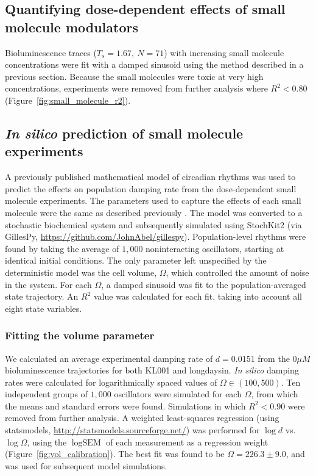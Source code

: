 \documentclass[11pt, letterpaper]{article}
\begin{document}
\subsection*{Quantifying dose-dependent effects of small molecule modulators}
Bioluminescence traces ($T_s = 1.67,\ N=71$) with increasing small molecule concentrations were fit with a damped sinusoid using the method described in a previous section.
Because the small molecules were toxic at very high concentrations, experiments were removed from further analysis where $R^2 < 0.80$ (Figure~\ref{fig:small_molecule_r2}).

\subsection*{{\itshape In silico} prediction of small molecule experiments}
A previously published mathematical model of circadian rhythms \cite{Hirota2012} was used to predict the effects on population damping rate from the dose-dependent small molecule experiments.
The parameters used to capture the effects of each small molecule were the same as described previously \cite{St.John2014}.
The model was converted to a stochastic biochemical system and subsequently simulated using StochKit2 \cite{Sanft2011a} (via GillesPy, \url{https://github.com/JohnAbel/gillespy}).
Population-level rhythms were found by taking the average of $1,000$ noninteracting oscillators, starting at identical initial conditions.
The only parameter left unspecified by the deterministic model was the cell volume, $\Omega$, which controlled the amount of noise in the system.
For each $\Omega$, a damped sinusoid was fit to the population-averaged state trajectory. 
An $R^2$ value was calculated for each fit, taking into account all eight state variables.

\subsubsection*{Fitting the volume parameter}
We calculated an average experimental damping rate of $d = 0.0151$ from the $0 \mu M$ bioluminescence trajectories for both KL001 and longdaysin.
{\itshape In silico} damping rates were calculated for logarithmically spaced values of $\Omega \in (100, 500)$.
Ten independent groups of $1,000$ oscillators were simulated for each $\Omega$, from which the means and standard errors were found.
Simulations in which $R^2 < 0.90$ were removed from further analysis.
A weighted least-squares regression (using statsmodels, \url{http://statsmodels.sourceforge.net/}) was performed for $\log d$ vs.\ $\log \Omega$, using the $\log \text{SEM}$ of each measurement as a regression weight (Figure~\ref{fig:vol_calibration}).
The best fit was found to be $\Omega = 226.3 \pm 9.0$, and was used for subsequent model simulations.
\end{document}
